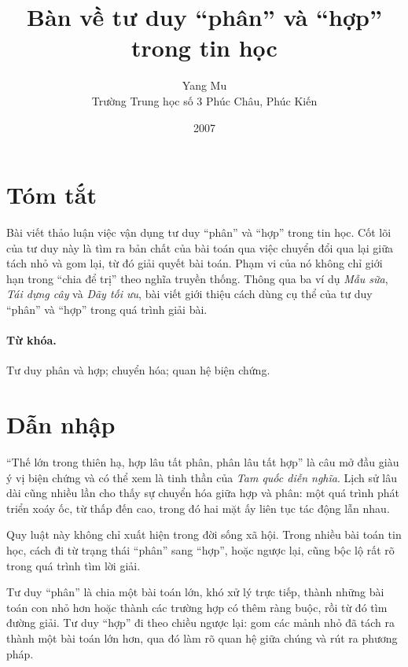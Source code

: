 \documentclass[11pt]{article}
\title{Bàn về tư duy ``phân'' và ``hợp'' trong tin học}
\author{Yang Mu\\Trường Trung học số 3 Phúc Châu, Phúc Kiến}
\date{2007}
\begin{document}
\maketitle


\section*{Tóm tắt}

Bài viết thảo luận việc vận dụng tư duy ``phân'' và ``hợp'' trong tin học. Cốt
lõi của tư duy này là tìm ra bản chất của bài toán qua việc chuyển đổi qua lại
giữa tách nhỏ và gom lại, từ đó giải quyết bài toán. Phạm vi của nó không chỉ
giới hạn trong ``chia để trị'' theo nghĩa truyền thống. Thông qua ba ví dụ
\textit{Mẫu sữa}, \textit{Tái dựng cây} và \textit{Dãy tối ưu}, bài viết giới
thiệu cách dùng cụ thể của tư duy ``phân'' và ``hợp'' trong quá trình giải
bài.

\paragraph{Từ khóa.}
Tư duy phân và hợp; chuyển hóa; quan hệ biện chứng.

\section{Dẫn nhập}

``Thế lớn trong thiên hạ, hợp lâu tất phân, phân lâu tất hợp'' là câu mở đầu
giàu ý vị biện chứng và có thể xem là tinh thần của \textit{Tam quốc diễn
nghĩa}. Lịch sử lâu dài cũng nhiều lần cho thấy sự chuyển hóa giữa hợp và
phân: một quá trình phát triển xoáy ốc, từ thấp đến cao, trong đó hai mặt ấy
liên tục tác động lẫn nhau.

Quy luật này không chỉ xuất hiện trong đời sống xã hội. Trong nhiều bài toán
tin học, cách đi từ trạng thái ``phân'' sang ``hợp'', hoặc ngược lại, cũng bộc
lộ rất rõ trong quá trình tìm lời giải.

Tư duy ``phân'' là chia một bài toán lớn, khó xử lý trực tiếp, thành những bài
toán con nhỏ hơn hoặc thành các trường hợp có thêm ràng buộc, rồi từ đó tìm
đường giải. Tư duy ``hợp'' đi theo chiều ngược lại: gom các mảnh nhỏ đã tách
ra thành một bài toán lớn hơn, qua đó làm rõ quan hệ giữa chúng và rút ra
phương pháp.
\end{document}
